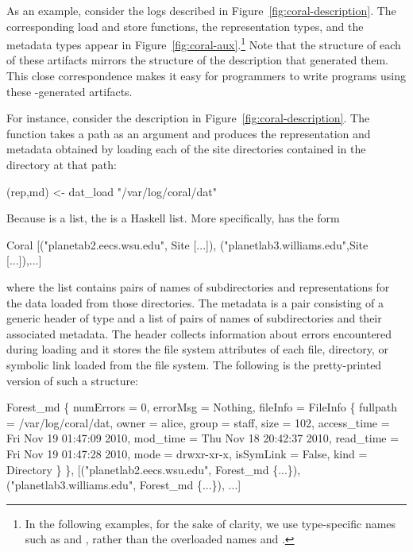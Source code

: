 As an example, consider the \coral{} logs described in
Figure~\ref{fig:coral-description}.  The corresponding load and store
functions, the representation types, and the metadata types appear in
Figure~\ref{fig:coral-aux}.\footnote{In the following examples, for
the sake of clarity, we use
  type-specific names such as  and
  , rather than the overloaded names  and .}
Note that the structure of each of these
artifacts mirrors the structure of the \forest{}
description that generated them. This close correspondence makes it
easy for programmers to write programs using these \forest{}-generated
artifacts.

%
For instance, consider the  description in
Figure~\ref{fig:coral-description}. The  function takes
a path as an argument and produces the representation and metadata
obtained by loading each of the site directories contained in the
directory at that path:
%
\begin{code}
(rep,md) <- dat_load "/var/log/coral/dat"
\end{code}
Because  is a \forest{} list, the  is a Haskell
list. More specifically,  has the form
\begin{code}
Coral [("planetab2.eecs.wsu.edu", Site [...]),
       ("planetlab3.williams.edu",Site [...]),...]
\end{code}
where the list contains pairs of names of subdirectories and
representations for the data loaded from those directories. The
metadata is a pair consisting of a generic header of type
 and a list of pairs of names of subdirectories and
their associated metadata. The header collects information
about errors encountered during loading and it stores the file system
attributes of each file, directory, or symbolic link loaded from the
file system.  The following is the pretty-printed version of such a
structure: 
%
\begin{code}
Forest_md 
  \{ numErrors = 0, 
    errorMsg = Nothing, 
    fileInfo = FileInfo
      \{ fullpath = /var/log/coral/dat, 
        owner = alice, group = staff, size = 102, 
        access_time = Fri Nov 19 01:47:09 2010, 
        mod_time = Thu Nov 18 20:42:37 2010, 
        read_time = Fri Nov 19 01:47:28 2010, 
        mode = drwxr-xr-x, isSymLink = False, 
        kind = Directory \} \},
[("planetlab2.eecs.wsu.edu", Forest_md \{...\}),
 ("planetlab3.williams.edu", Forest_md \{...\}), ...]
\end{code}


